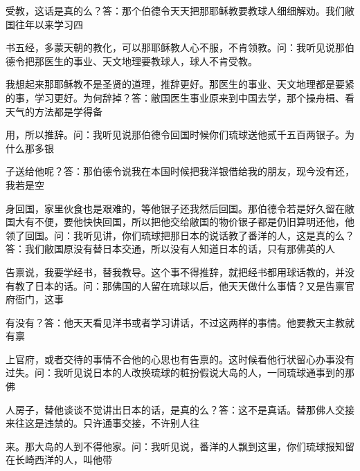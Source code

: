 \vfill
\begin{BookNotes}
\end{BookNotes}

受教，这话是真的么？答：那个伯德令天天把那耶稣教要教球人细细解劝。我们敝国往年以来学习四

书五经，多蒙天朝的教化，可以那耶稣教人心不服，不肯领教。问：我听见说那伯德令把那医生的事业、天文地理要教球人，球人不肯受教。

我想起来那耶稣教不是圣贤的道理，推辞更好。那医生的事业、天文地理都是要紧的事，学习更好。为何辞掉？答：敝国医生事业原来到中国去学，那个操舟楫、看天气的方法都是学得备

用，所以推辞。问：我听见说那伯德令回国时候你们琉球送他贰千五百两银子。为什么那多银

子送给他呢？答：那伯德令说我在本国时候把我洋银借给我的朋友，现今没有还，我若是空

身回国，家里伙食也是艰难的，等他银子还我然后回国。那伯德令若是好久留在敝国大有不便，要他快快回国，所以把他交给敝国的物价银子都是仍旧算明还他，他领了回国。问：我听见讲，你们琉球把那日本的说话教了番洋的人，这是真的么？答：我们敝国原没有替日本交通，所以没有人知道日本的话，只有那佛英的人

告禀说，我要学经书，替我教导。这个事不得推辞，就把经书都用球话教的，并没有教了日本的话。问：那佛国的人留在琉球以后，他天天做什么事情？又是告禀官府衙门，这事

有没有？答：他天天看见洋书或者学习讲话，不过这两样的事情。他要教天主教就有禀

上官府，或者交待的事情不合他的心思也有告禀的。这时候看他行状留心办事没有过失。问：我听见说日本的人改换琉球的粧扮假说大岛的人，一同琉球通事到的那佛

人房子，替他谈谈不觉讲出日本的话，是真的么？答：这不是真话。替那佛人交接来往这是违禁的。只许通事交接，不许别人往


来。那大岛的人到不得他家。问：我听见说，番洋的人飘到这里，你们琉球报知留在长崎西洋的人，叫他带


